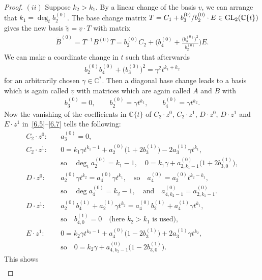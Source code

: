 \documentclass[10pt,a4paper]{amsart}
\numberwithin{equation}{section}
\numberwithin{figure}{section}
\newcommand{\C}{{\mathbb C}}
\newcommand{\www}{\widetilde}
\newcommand{\uuuu}{\underline}
\begin{document}
\begin{proof}
\medskip
$(ii)$ Suppose $k_2>k_1$.
By a linear change of the basis $\uuuu{v}$, we can arrange
that $k_1=\deg_tb_2^{(0)}$. The base change matrix
$T=C_1+b_3^{(0)}/b_2^{(0)}\cdot E\in {\rm GL}_2(\C\{t\})$
gives the new basis $\uuuu{\www v}=\uuuu{v}\cdot T$
with matrix
\begin{gather*}
\www B^{(0)}=T^{-1}B^{(0)}T=b_2^{(0)}C_2+
\bigg(b_4^{(0)}+\frac{\big(b_3^{(0)}\big)^2}{b_2^{(0)}}\bigg)E.
\end{gather*}
We can make a coordinate change in $t$ such that afterwards
\begin{gather*}
b_2^{(0)}b_4^{(0)}+\big(b_3^{(0)}\big)^2=\gamma^2 t^{k_1+k_2}
\end{gather*}
for an arbitrarily chosen $\gamma\in\C^*$.
Then a diagonal base change leads to a basis
which is again called $\uuuu{v}$ with matrices
which are again called $A$ and $B$ with
\begin{gather*}%
b_3^{(0)}=0,\qquad
b_2^{(0)}=\gamma t^{k_1},\qquad
b_4^{(0)}=\gamma t^{k_2}.
\end{gather*}
Now the vanishing of the coefficients in $\C\{t\}$ of
$C_2\cdot z^0$, $C_2\cdot z^1$, $D\cdot z^0$, $D\cdot z^1$
and $E\cdot z^1$ in~\eqref{6.5}--\eqref{6.7}
tells the following:
\begin{align*}
C_2\cdot z^0\colon \quad &a_3^{(0)}=0,
\\
C_2\cdot z^1\colon \quad &0=k_1\gamma t^{k_1-1}+a_2^{(0)}\big(1+2b_3^{(1)}\big)
-2a_3^{(1)}\gamma t^{k_1},
\\
&\text{so}\quad \deg_t a_2^{(0)}=k_1-1,\quad
0=k_1\gamma +a_{2,k_1-1}^{(0)}\big(1+2b_{3,0}^{(1)}\big),
\\
D\cdot z^0\colon\quad &a_2^{(0)}\gamma t^{k_2}=a_4^{(0)}\gamma t^{k_1},
\quad\text{so}\quad a_4^{(0)}=a_2^{(0)}t^{k_2-k_1},
\\
&\text{so}\quad \deg a_4^{(0)}=k_2-1,\quad\text{and}\quad
a_{4,k_2-1}^{(0)}=a_{2,k_1-1}^{(0)}.
\\
D\cdot z^1\colon\quad &a_2^{(0)}b_4^{(1)}+a_2^{(1)}\gamma t^{k_2}
=a_4^{(0)}b_2^{(1)}+a_4^{(1)}\gamma t^{k_1},
\\
&\text{so}\quad b_{4,0}^{(1)}=0 \quad \text{(here }
k_2>k_1\text{ is used)},
\\
E\cdot z^1\colon\quad & 0=k_2\gamma t^{k_2-1}+a_4^{(0)}\big(1-2b_3^{(1)}\big)
+2a_3^{(1)}\gamma t^{k_2},
\\
&\text{so}\quad 0=k_2\gamma +a_{4,k_2-1}^{(0)}\big(1-2b_{3,0}^{(1)}\big).
\end{align*}
This shows
\begin{gather*}%

\end{gather*}
\end{proof}
\end{document}
